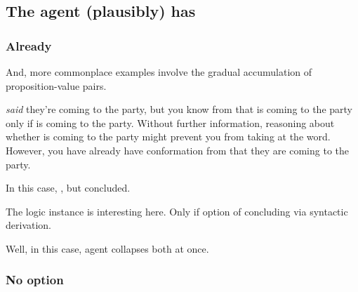 \subsection{The agent (plausibly) has \zS{}}
\label{cha:zS:sec:question:illu:basic:has}

\subsubsection{Already}

\begin{note}
  And, more commonplace examples involve the gradual accumulation of proposition-value pairs.

  \begin{illustration}
     \emph{said} they're coming to the party, but you know from  that  is coming to the party only if  is coming to the party.
    Without further information, reasoning about whether  is coming to the party might prevent you from taking  at the word.
    However, you have already have conformation from  that they are coming to the party.
  \end{illustration}
\end{note}

\begin{note}
  In this case, \requ{}, but concluded.
\end{note}

\begin{note}
  The logic instance is interesting here.
  Only if option of concluding via syntactic derivation.

  Well, in this case, agent collapses both at once.
\end{note}

\subsubsection{No option}

